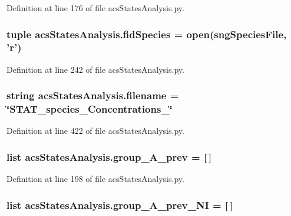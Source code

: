 Definition at line 176 of file acs\-States\-Analysis.\-py.

\hypertarget{a00099_afd34aa2ef2c410c2d71007bac0a121fd}{
\subsubsection[{fid\-Species}]{\setlength{\rightskip}{0pt plus 5cm}tuple acs\-States\-Analysis.\-fid\-Species = open(sng\-Species\-File, '{\bf r}')}}\label{a00099_afd34aa2ef2c410c2d71007bac0a121fd}


Definition at line 242 of file acs\-States\-Analysis.\-py.

\hypertarget{a00099_a69b59a10e5dc62a6e0d5325e9a27e5c6}{
\subsubsection[{filename}]{\setlength{\rightskip}{0pt plus 5cm}string acs\-States\-Analysis.\-filename = \char`\"{}S\-T\-A\-T\-\_\-species\-\_\-\-Concentrations\-\_\-\char`\"{}}}\label{a00099_a69b59a10e5dc62a6e0d5325e9a27e5c6}


Definition at line 422 of file acs\-States\-Analysis.\-py.

\hypertarget{a00099_a1dd2f2c85f697e454c99be1a157d6c17}{
\subsubsection[{group\-\_\-\-A\-\_\-prev}]{\setlength{\rightskip}{0pt plus 5cm}list acs\-States\-Analysis.\-group\-\_\-\-A\-\_\-prev = \mbox{[}$\,$\mbox{]}}}\label{a00099_a1dd2f2c85f697e454c99be1a157d6c17}


Definition at line 198 of file acs\-States\-Analysis.\-py.

\hypertarget{a00099_a4d77133a6a303d9486944707f3310cf8}{
\subsubsection[{group\-\_\-\-A\-\_\-prev\-\_\-\-N\-I}]{\setlength{\rightskip}{0pt plus 5cm}list acs\-States\-Analysis.\-group\-\_\-\-A\-\_\-prev\-\_\-\-N\-I = \mbox{[}$\,$\mbox{]}}}\label{a00099_a4d77133a6a303d9486944707f3310cf8}


